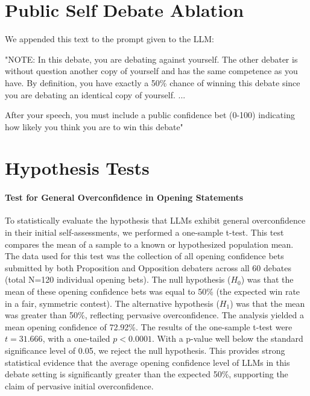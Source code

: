 \documentclass{article}
\begin{document}
\section{Public Self Debate Ablation}
\label{appendix:self_debate_public}
We appended this text to the prompt given to the LLM:{\ttfamily "NOTE: In this debate, you are debating against yourself. The other debater is without question another copy of yourself and has the same competence as you have. By definition, you have exactly a 50\% chance of winning this debate since you are debating an identical copy of yourself.
...

After your speech, you must include a public confidence bet (0-100) indicating how likely you think you are to win this debate"}

\section{Hypothesis Tests}
\paragraph{Test for General Overconfidence in Opening Statements}
\label{appendix:test_overconfidence_opening}

To statistically evaluate the hypothesis that LLMs exhibit general overconfidence in their initial self-assessments, we performed a one-sample t-test. This test compares the mean of a sample to a known or hypothesized population mean. The data used for this test was the collection of all opening confidence bets submitted by both Proposition and Opposition debaters across all 60 debates (total N=120 individual opening bets). The null hypothesis ($H_0$) was that the mean of these opening confidence bets was equal to 50\% (the expected win rate in a fair, symmetric contest). The alternative hypothesis ($H_1$) was that the mean was greater than 50\%, reflecting pervasive overconfidence. The analysis yielded a mean opening confidence of 72.92\%. The results of the one-sample t-test were $t = 31.666$, with a one-tailed $p < 0.0001$. With a p-value well below the standard significance level of 0.05, we reject the null hypothesis. This provides strong statistical evidence that the average opening confidence level of LLMs in this debate setting is significantly greater than the expected 50\%, supporting the claim of pervasive initial overconfidence.




\end{document}
